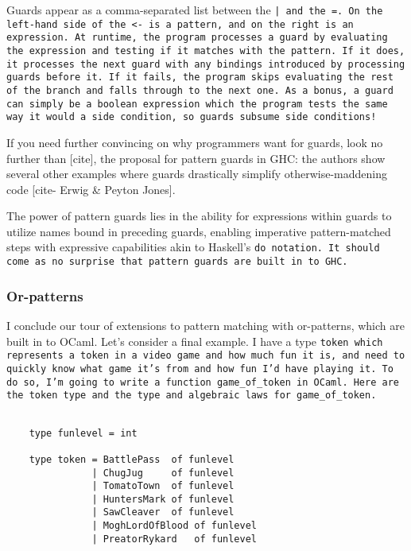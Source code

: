 \documentclass[manuscript,screen,review, 12pt, nonacm]{acmart}
\begin{document}
\begin{outline}[enumerate]
    Guards appear as a comma-separated list between the \tt{|} and the \tt{=}.
    On the left-hand side of the \tt{<-} is a pattern, and on the right is an
    expression. At runtime, the program processes a guard by evaluating the
    expression and testing if it matches with the pattern. If it does, it
    processes the next guard with any bindings introduced by processing guards
    before it. If it fails, the program skips evaluating the rest of the branch
    and falls through to the next one. As a bonus, a guard can simply be a
    boolean expression which the program tests the same way it would a side
    condition, so guards subsume side conditions! 
    
    If you need further convincing on why programmers want for guards, look no
    further than [cite], the proposal for pattern guards in GHC: the authors
    show several other examples where guards drastically simplify
    otherwise-maddening code [cite- Erwig \& Peyton Jones]. 
    
    The power of pattern guards lies in the ability for expressions within
    guards to utilize names bound in preceding guards, enabling imperative
    pattern-matched steps with expressive capabilities akin to Haskell's \tt{do}
    notation. It should come as no surprise that pattern guards are built in to
    GHC. 

\subsubsection{Or-patterns}

    I conclude our tour of extensions to pattern matching with or-patterns,
    which are built in to OCaml. Let's consider a final example. I have a type
    \tt{token} which represents a token in a video game and how much fun it is,
    and need to quickly know what game it's from and how fun I'd have playing
    it. To do so, I'm going to write a function \tt{game\_of\_token} in OCaml.
    Here are the \tt{token} type and the type and algebraic laws for
    \tt{game\_of\_token}. 

\begin{minipage}[t]{\textwidth}
    \centering 
    \begin{verbatim}

    type funlevel = int

    type token = BattlePass  of funlevel 
               | ChugJug     of funlevel 
               | TomatoTown  of funlevel
               | HuntersMark of funlevel 
               | SawCleaver  of funlevel
               | MoghLordOfBlood of funlevel 
               | PreatorRykard   of funlevel
                   


\end{verbatim}
\end{minipage}
\end{outline}
\end{document}
